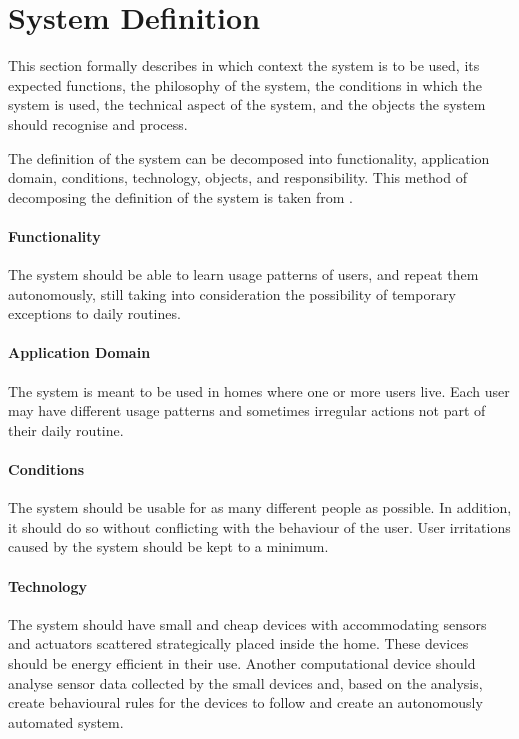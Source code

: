 \section{System Definition}\label{sec:systemDefinition}

This section formally describes in which context the system is to be used, its expected functions, the philosophy of the system, the conditions in which the system is used, the technical aspect of the system, and the objects the system should recognise and process.

The definition of the system can be decomposed into functionality, application domain, conditions, technology, objects, and responsibility. This method of decomposing the definition of the system is taken from \cite{mathiassen2001objektorienteret}.

\paragraph{Functionality}
The system should be able to learn usage patterns of users, and repeat them autonomously, still taking into consideration the possibility of temporary exceptions to daily routines.

\paragraph{Application Domain}
The system is meant to be used in homes where one or more users live. Each user may have different usage patterns and sometimes irregular actions not part of their daily routine.

\paragraph{Conditions}
The system should be usable for as many different people as possible. In addition, it should do so without conflicting with the behaviour of the user. User irritations caused by the system should be kept to a minimum.

\paragraph{Technology}
The system should have small and cheap devices with accommodating sensors and actuators scattered strategically placed inside the home. These devices should be energy efficient in their use. Another computational device should analyse sensor data collected by the small devices and, based on the analysis, create behavioural rules for the devices to follow and create an autonomously automated system.

